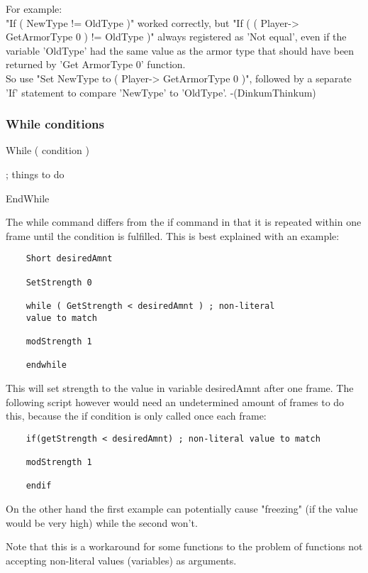 For example:\\
"If ( NewType != OldType )" worked correctly, but "If ( (
Player-> GetArmorType 0 ) != OldType )" always registered as
'Not equal', even if the variable 'OldType' had the same value as the
armor type that should have been returned by 'Get ArmorType 0'
function.\\
So use "Set NewType to ( Player-> GetArmorType 0 )", followed
by a separate 'If' statement to compare 'NewType' to 'OldType'.
-(DinkumThinkum)

\hypertarget{while-conditions}{%
\subsubsection{While conditions}\label{while-conditions}}

	While ( condition )
	
	; things to do
	
	EndWhile

The while command differs from the if command in that it is repeated
within one frame until the condition is fulfilled. This is best
explained with an example:

\begin{lstlisting}
	Short desiredAmnt
	
	SetStrength 0
	
	while ( GetStrength < desiredAmnt ) ; non-literal
	value to match
	
	modStrength 1
	
	endwhile
\end{lstlisting}

This will set strength to the value in variable desiredAmnt after one
frame. The following script however would need an undetermined amount of
frames to do this, because the if condition is only called once each
frame:

\begin{lstlisting}
	if(getStrength < desiredAmnt) ; non-literal value to match
	
	modStrength 1
	
	endif
\end{lstlisting}

On the other hand the first example can potentially cause "freezing" (if
the value would be very high) while the second won't.

Note that this is a workaround for some functions to the problem of
functions not accepting non-literal values (variables) as arguments.

